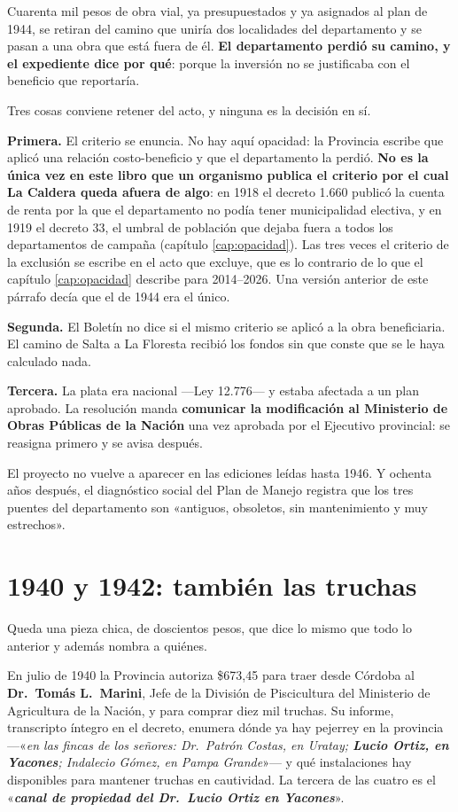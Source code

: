 Cuarenta mil pesos de obra vial, ya presupuestados y ya asignados al plan de 1944, se retiran
del camino que uniría dos localidades del departamento y se pasan a una obra que está fuera de
él. \textbf{El departamento perdió su camino, y el expediente dice por qué}: porque la
inversión no se justificaba con el beneficio que reportaría.

Tres cosas conviene retener del acto, y ninguna es la decisión en sí.

\textbf{Primera.} El criterio se enuncia. No hay aquí opacidad: la Provincia escribe que aplicó
una relación costo-beneficio y que el departamento la perdió. \textbf{No es la única vez en este
libro que un organismo publica el criterio por el cual La Caldera queda afuera de algo}: en 1918 el
decreto 1.660 publicó la cuenta de renta por la que el departamento no podía tener municipalidad
electiva, y en 1919 el decreto 33, el umbral de población que dejaba fuera a todos los
departamentos de campaña (capítulo \ref{cap:opacidad}). Las tres veces el criterio de la exclusión
se escribe en el acto que excluye, que es lo contrario de lo que el capítulo \ref{cap:opacidad}
describe para 2014--2026. Una versión anterior de este párrafo decía que el de 1944 era el único.

\textbf{Segunda.} El Boletín no dice si el mismo criterio se aplicó a la obra beneficiaria. El
camino de Salta a La Floresta recibió los fondos sin que conste que se le haya calculado nada.

\textbf{Tercera.} La plata era nacional ---Ley 12.776--- y estaba afectada a un plan aprobado.
La resolución manda \textbf{comunicar la modificación al Ministerio de Obras Públicas de la
Nación} una vez aprobada por el Ejecutivo provincial: se reasigna primero y se avisa después.

El proyecto no vuelve a aparecer en las ediciones leídas hasta 1946. Y
ochenta años después, el diagnóstico social del Plan de Manejo registra que los tres
puentes del departamento son «antiguos, obsoletos, sin mantenimiento y muy estrechos».

\section{1940 y 1942: también las truchas}

Queda una pieza chica, de doscientos pesos, que dice lo mismo que todo lo anterior y además
nombra a quiénes.

En julio de 1940 la Provincia autoriza \$673,45 para traer desde Córdoba al \textbf{Dr.\ Tomás
L.\ Marini}, Jefe de la División de Piscicultura del Ministerio de Agricultura de la Nación, y
para comprar diez mil truchas. Su informe, transcripto íntegro en el decreto, enumera dónde ya
hay pejerrey en la provincia ---«\textit{en las fincas de los señores: Dr.\ Patrón Costas, en
Uratay; \textbf{Lucio Ortiz, en Yacones}; Indalecio Gómez, en Pampa Grande}»--- y qué
instalaciones hay disponibles para mantener truchas en cautividad. La tercera de las cuatro es
el «\textit{\textbf{canal de propiedad del Dr.\ Lucio Ortiz en Yacones}}».

